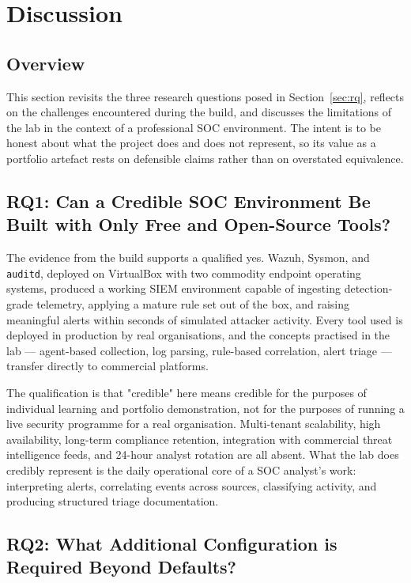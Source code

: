 \section{Discussion}
\label{sec:discussion}

\subsection{Overview}

This section revisits the three research questions posed in
Section~\ref{sec:rq}, reflects on the challenges encountered during the
build, and discusses the limitations of the lab in the context of a
professional SOC environment. The intent is to be honest about what the
project does and does not represent, so its value as a portfolio artefact
rests on defensible claims rather than on overstated equivalence.

\subsection{RQ1: Can a Credible SOC Environment Be Built with Only Free and Open-Source Tools?}

The evidence from the build supports a qualified yes. Wazuh, Sysmon, and
\texttt{auditd}, deployed on VirtualBox with two commodity endpoint
operating systems, produced a working SIEM environment capable of ingesting
detection-grade telemetry, applying a mature rule set out of the box, and
raising meaningful alerts within seconds of simulated attacker activity.
Every tool used is deployed in production by real organisations, and the
concepts practised in the lab --- agent-based collection, log parsing,
rule-based correlation, alert triage --- transfer directly to commercial
platforms.

The qualification is that "credible" here means credible for the purposes of
individual learning and portfolio demonstration, not for the purposes of
running a live security programme for a real organisation. Multi-tenant
scalability, high availability, long-term compliance retention, integration
with commercial threat intelligence feeds, and 24-hour analyst rotation are
all absent. What the lab does credibly represent is the daily operational
core of a SOC analyst's work: interpreting alerts, correlating events across
sources, classifying activity, and producing structured triage
documentation.

\subsection{RQ2: What Additional Configuration is Required Beyond Defaults?}

